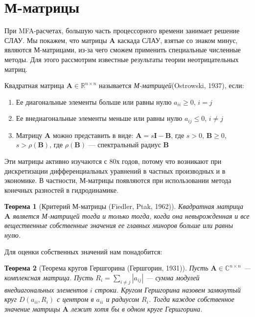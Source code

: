 \documentclass[14pt, a4paper]{extreport}
\begin{document}
\clearpage

\section{М-матрицы}
При MFA-расчетах, большую часть процессорного времени занимает решение СЛАУ. Мы покажем, что матрицы $\mathbf{A}$ каскада СЛАУ, взятые со знаком минус, являются М-матрицами, из-за чего сможем применить специальные численные методы. Для этого рассмотрим известные результаты теории неотрицательных матриц.

Квадратная матрица $\mathbf{A} \in \mathbb{R}^{n \times n}$ называется \emph{М-матрицей}(Ostrowski, 1937)\cite{m_matrix_orig}, если:
\begin{enumerate}
	\item Ее диагональные элементы больше или равны нулю $a_{ii} \ge 0$, $i = j$
	\item Ее внедиагональные элементы меньше или равны нулю $a_{ij} \le 0$, $i \neq j$
	\item Матрицу $\mathbf{A}$ можно представить в виде: $\mathbf{A} = s\mathbf{I} - \mathbf{B}$, где $s > 0$, $\mathbf{B} \ge 0$, $s > \rho(\mathbf{B})$, где $\rho(\mathbf{B})$ --- спектральный радиус $\mathbf{B}$
\end{enumerate}
Эти матрицы активно изучаются с 80х годов, потому что возникают при дискретизации дифференциальных уравнений в частных производных и в экономике. В частности, М-матрицы появляются при использовании метода конечных разностей в гидродинамике\cite{m_matrix_application_1, m_matrix_application_2,m_matrix_application_3,m_matrix_application_4}.

\newtheorem{theorem}{Теорема}
\begin{theorem}[Критерий М-матрицы (Fiedler, Ptak, 1962)\cite{m_matrix_def}]
	\label{m_matrix_criterion}
	Квадратная матрица $\mathbf{A}$ является М-матрицей тогда и только тогда, когда она невырожденная и все вещественные собственные значения ее главных миноров больше или равны нулю. 	
\end{theorem}

Для оценки собственных значений нам понадобится:
\begin{theorem}[Теорема кругов Гершгорина (Гершгорин, 1931)\cite{circle_theorem}]
	\label{circle_theorem}
	Пусть $\mathbf{A} \in \mathbb{C}^{n \times n}$ --- комплексная матрица. Пусть $R_i = \sum_{i \neq j} |a_{ij}|$ --- сумма модулей внедиагональных элементов $i$ строки. Кругом Гершгорина назовем замкнутый круг $D(a_{ii}, R_i)$ с центром в $a_{ii}$ и радиусом $R_i$. Тогда каждое собственное значение матрицы $\mathbf{A}$ лежит хотя бы в одном круге Гершгорина. 
\end{theorem}
\end{document}
